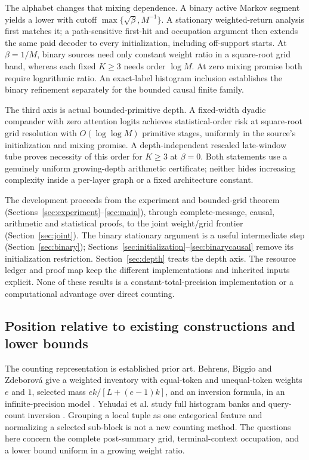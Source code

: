 \documentclass[11pt,letterpaper]{article}
\theoremstyle{definition}\newtheorem{definition}[theorem]{Definition}
\theoremstyle{remark}\newtheorem{remark}[theorem]{Remark}
\begin{document}
The alphabet changes that mixing dependence. A binary active Markov segment yields a lower with cutoff $\max\{\sqrt\beta,M^{-1}\}$. A stationary weighted-return analysis first matches it; a path-sensitive first-hit and occupation argument then extends the same paid decoder to every initialization, including off-support starts. At $\beta=1/M$, binary sources need only constant weight ratio in a square-root grid band, whereas each fixed $K\ge3$ needs order $\log M$. At zero mixing promise both require logarithmic ratio. An exact-label histogram inclusion establishes the binary refinement separately for the bounded causal finite family.

The third axis is actual bounded-primitive depth. A fixed-width dyadic compander with zero attention logits achieves statistical-order risk at square-root grid resolution with $O(\log\log M)$ primitive stages, uniformly in the source's initialization and mixing promise. A depth-independent rescaled late-window tube proves necessity of this order for $K\ge3$ at $\beta=0$. Both statements use a genuinely uniform growing-depth arithmetic certificate; neither hides increasing complexity inside a per-layer graph or a fixed architecture constant.

The development proceeds from the experiment and bounded-grid theorem (Sections~\ref{sec:experiment}--\ref{sec:main}), through complete-message, causal, arithmetic and statistical proofs, to the joint weight/grid frontier (Section~\ref{sec:joint}). The binary stationary argument is a useful intermediate step (Section~\ref{sec:binary}); Sections~\ref{sec:initialization}--\ref{sec:binarycausal} remove its initialization restriction. Section~\ref{sec:depth} treats the depth axis. The resource ledger and proof map keep the different implementations and inherited inputs explicit. None of these results is a constant-total-precision implementation or a computational advantage over direct counting.

\subsection{Position relative to existing constructions and lower bounds}
The counting representation is established prior art. Behrens, Biggio and Zdeborov\'a give a weighted inventory with equal-token and unequal-token weights $e$ and $1$, selected mass $ek/[L+(e-1)k]$, and an inversion formula, in an infinite-precision model \citep[Appendix B.3]{behrens2025}. Yehudai et al. study full histogram banks and query-count inversion \citep[Sections 4.1--4.2]{yehudai2026}. Grouping a local tuple as one categorical feature and normalizing a selected sub-block is not a new counting method. The questions here concern the complete post-summary grid, terminal-context occupation, and a lower bound uniform in a growing weight ratio.
\end{document}
